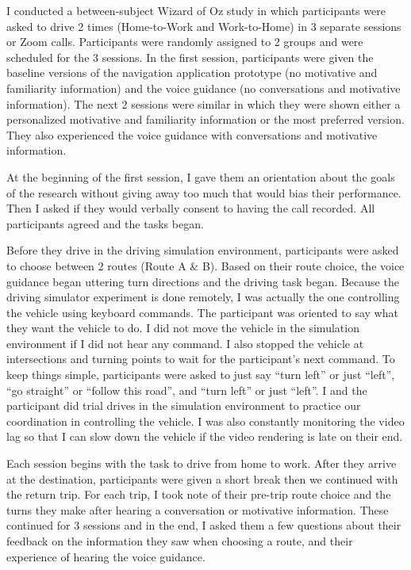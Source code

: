 I conducted a between-subject Wizard of Oz study in which participants were asked to drive 2 times (Home-to-Work and Work-to-Home) in 3 separate sessions or Zoom calls. Participants were randomly assigned to 2 groups and were scheduled for the 3 sessions. In the first session, participants were given the baseline versions of the navigation application prototype (no motivative and familiarity information) and the voice guidance (no conversations and motivative information). The next 2 sessions were similar in which they were shown either a personalized motivative and familiarity information or the most preferred version. They also experienced the voice guidance with conversations and motivative information. 

At the beginning of the first session, I gave them an orientation about the goals of the research without giving away too much that would bias their performance. Then I asked if they would verbally consent to having the call recorded. All participants agreed and the tasks began.

Before they drive in the driving simulation environment, participants were asked to choose between 2 routes (Route A \& B). Based on their route choice, the voice guidance began uttering turn directions and the driving task began. Because the driving simulator experiment is done remotely, I was actually the one controlling the vehicle using keyboard commands. The participant was oriented to say what they want the vehicle to do. I did not move the vehicle in the simulation environment if I did not hear any command. I also stopped the vehicle at intersections and turning points to wait for the participant's next command. To keep things simple, participants were asked to just say ``turn left'' or just ``left'', ``go straight'' or ``follow this road'', and ``turn left'' or just ``left''. I and the participant did trial drives in the simulation environment to practice our coordination in controlling the vehicle. I was also constantly monitoring the video lag so that I can slow down the vehicle if the video rendering is late on their end. 

Each session begins with the task to drive from home to work. After they arrive at the destination, participants were given a short break then we continued with the return trip. For each trip, I took note of their pre-trip route choice and the turns they make after hearing a conversation or motivative information. These continued for 3 sessions and in the end, I asked them a few questions about their feedback on the information they saw when choosing a route, and their experience of hearing the voice guidance. 

